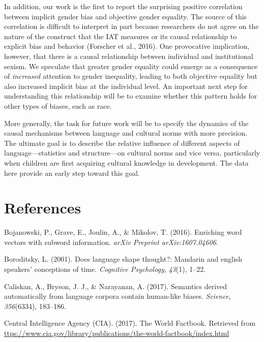 \documentclass[10pt, letterpaper]{article}
\begin{document}
In addition, our work is the first to report the surprising positive
correlation between implicit gender bias and objective gender equality.
The source of this correlation is difficult to interpret in part because
researchers do not agree on the nature of the construct that the IAT
measures or its causal relationship to explicit bias and behavior
(Forscher et al., 2016). One provocative implication, however, that
there is a causal relationship between individual and institutional
sexism. We speculate that greater gender equality could emerge as a
consequence of \emph{increased} attention to gender inequality, leading
to both objective equality but also increased implicit bias at the
individual level. An important next step for understanding this
relationship will be to examine whether this pattern holds for other
types of biases, such as race.

More generally, the task for future work will be to specify the dynamics
of the causal mechanisms between language and cultural norms with more
precision. The ultimate goal is to describe the relative influence of
different aspects of language---statistics and structure---on cultural
norms and vice versa, particularly when children are first acquiring
cultural knowledge in development. The data here provide an early step
toward this goal.

\section{References}\label{references}

\setlength{\parindent}{-0.1in} \setlength{\leftskip}{0.125in} \noindent

\hypertarget{refs}{}
\hypertarget{ref-bojanowski2016enriching}{}
Bojanowski, P., Grave, E., Joulin, A., \& Mikolov, T. (2016). Enriching
word vectors with subword information. \emph{arXiv Preprint
arXiv:1607.04606}.

\hypertarget{ref-boroditsky2001does}{}
Boroditsky, L. (2001). Does language shape thought?: Mandarin and
english speakers' conceptions of time. \emph{Cognitive Psychology},
\emph{43}(1), 1--22.

\hypertarget{ref-caliskan2017semantics}{}
Caliskan, A., Bryson, J. J., \& Narayanan, A. (2017). Semantics derived
automatically from language corpora contain human-like biases.
\emph{Science}, \emph{356}(6334), 183--186.

\hypertarget{ref-ciafactbook}{}
Central Intelligence Agency (CIA). (2017). The World Factbook. Retrieved
from
\url{ttps://www.cia.gov/library/publications/the-world-factbook/index.html}
\end{document}
